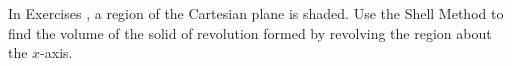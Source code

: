 {\noindent In Exercises}
{, a region of the Cartesian plane is shaded. Use the Shell Method to find the volume of the solid of revolution formed by revolving the region about the $x$-axis.
}
